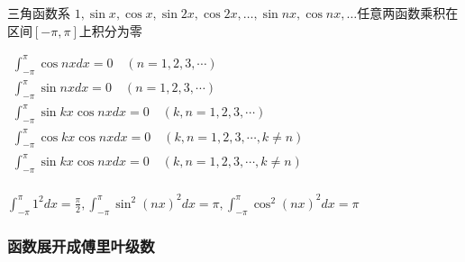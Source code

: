 \documentclass[UTF8]{ctexart}
\newcommand{\mf}[1]{\left( #1\right)}
\newcommand{\mfc}[1]{\left[ #1 \right]}
\newcommand{\q}{\quad}
\newcommand{\ma}[1]{\begin{array}{llll} #1 \end{array}}
\begin{document}
三角函数系 $1,\sin x ,\cos x,\sin 2x ,\cos 2x,\dots,\sin nx ,\cos nx,\dots$任意两函数乘积在区间$\mfc{-\pi,\pi}$上积分为零 

$\ma{
    \int_{-\pi}^{\pi} \cos nx dx=0 \q \mf{n=1,2,3,\cdots}\\
    \int_{-\pi}^{\pi} \sin nx dx=0 \q \mf{n=1,2,3,\cdots}\\
    \int_{-\pi}^{\pi} \sin kx \cos nx dx=0 \q \mf{k,n=1,2,3,\cdots}\\
    \int_{-\pi}^{\pi} \cos kx \cos nx dx=0 \q \mf{k,n=1,2,3,\cdots,k\neq n}\\
    \int_{-\pi}^{\pi} \sin kx \cos nx dx=0 \q \mf{k,n=1,2,3,\cdots,k\neq n}\\
}$

$\int_{-\pi}^{\pi} 1^2dx=\frac{\pi}{2},\int_{-\pi}^{\pi} {\sin^2\mf{nx}}^2dx=\pi,\int_{-\pi}^{\pi} {\cos^2\mf{nx}}^2dx=\pi$



\subsubsection{函数展开成傅里叶级数 }
\end{document}
